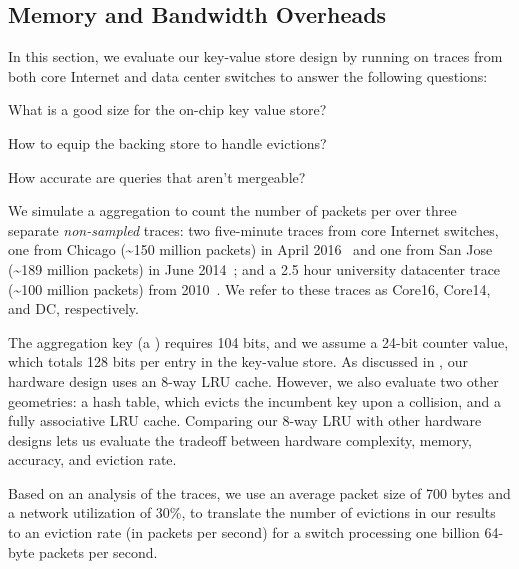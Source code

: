 \subsection{Memory and Bandwidth Overheads}
\label{s:eval:traces}
\label{sec:eval:traces}


In this section, we evaluate our key-value store design by running \TheSystem
on traces from both core Internet and data center switches to answer the
following questions:
\begin{CompactEnumerate}
\item What is a good size for the on-chip key value store?
\item How to equip the backing store to handle evictions?
\item How accurate are queries that aren't mergeable?
\end{CompactEnumerate}

  We simulate a \TheSystem aggregation to count the number of
packets per \txtftuple over three separate {\em non-sampled} traces: two
five-minute traces from core Internet switches, one from Chicago
(\textasciitilde{}150 million packets) in April 2016~\cite{caida2016} and one
from San Jose (\textasciitilde{}189 million packets) in June
2014~\cite{caida2014}; and a 2.5 hour university datacenter trace
(\textasciitilde{}100 million packets) from 2010~\cite{bensonDC}. We refer to
these traces as Core16, Core14, and DC, respectively.

The aggregation key (a \txtftuple) requires 104 bits, and we assume a 24-bit
counter value, which totals 128 bits per entry in the key-value store. As
discussed in , our hardware design uses an 8-way LRU
cache. However, we also evaluate two other geometries: a hash table, which
evicts the incumbent key upon a collision, and a fully associative LRU
cache. Comparing our 8-way LRU with other hardware designs lets us evaluate the
tradeoff between hardware complexity, memory, accuracy, and eviction rate.

Based on an analysis of the traces, we use an average packet size of 700 bytes
and a network utilization of 30\%, to translate the number of evictions in our
results to an eviction rate (in packets per second) for a switch processing one
billion 64-byte packets per second.

